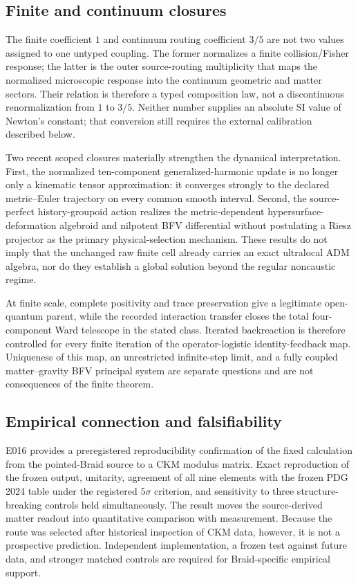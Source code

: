 \documentclass[11pt]{article}
\theoremstyle{definition}
\theoremstyle{remark}
\begin{document}
\subsection{Finite and continuum closures}

The finite coefficient $1$ and continuum routing coefficient $3/5$ are not two
values assigned to one untyped coupling. The former normalizes a finite
collision/Fisher response; the latter is the outer source-routing multiplicity
that maps the normalized microscopic response into the continuum geometric
and matter sectors. Their relation is therefore a typed composition law, not
a discontinuous renormalization from $1$ to $3/5$. Neither number supplies an
absolute SI value of Newton's constant; that conversion still requires the
external calibration described below.

Two recent scoped closures materially strengthen the dynamical interpretation.
First, the normalized ten-component generalized-harmonic update is no longer
only a kinematic tensor approximation: it converges strongly to the declared
metric--Euler trajectory on every common smooth interval. Second, the
source-perfect history-groupoid action realizes the metric-dependent
hypersurface-deformation algebroid and nilpotent BFV differential without
postulating a Riesz projector as the primary physical-selection mechanism.
These results do not imply that the unchanged raw finite cell already carries
an exact ultralocal ADM algebra, nor do they establish a global solution beyond
the regular noncaustic regime.

At finite scale, complete positivity and trace preservation give a legitimate
open-quantum parent, while the recorded interaction transfer closes the total
four-component Ward telescope in the stated class. Iterated backreaction is
therefore controlled for every finite iteration of the operator-logistic
identity-feedback map. Uniqueness of this map, an unrestricted infinite-step
limit, and a fully coupled matter--gravity BFV principal system are separate
questions and are not consequences of the finite theorem.

\subsection{Empirical connection and falsifiability}

E016 provides a preregistered reproducibility confirmation of the fixed calculation from the pointed-Braid source to a CKM modulus matrix. Exact reproduction of the frozen output, unitarity, agreement of all nine elements with the frozen PDG 2024 table under the registered $5\sigma$ criterion, and sensitivity to three structure-breaking controls held simultaneously. The result moves the source-derived matter readout into quantitative comparison with measurement. Because the route was selected after historical inspection of CKM data, however, it is not a prospective prediction. Independent implementation, a frozen test against future data, and stronger matched controls are required for Braid-specific empirical support.
\end{document}
